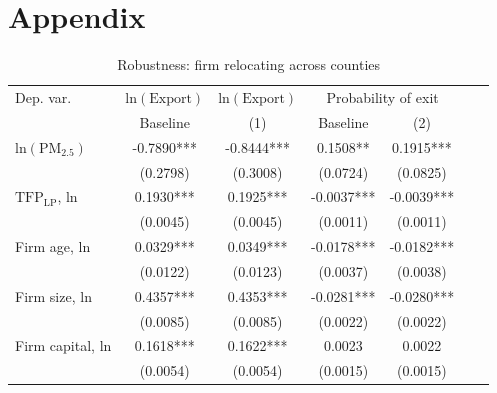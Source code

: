 \documentclass[12pt]{article}
\begin{document}
\renewcommand \thepart{}
\renewcommand \partname{}
\part{Appendix} %
\parttoc 
\begin{table}[H]\centering
  \caption{Robustness: firm relocating across counties}
\footnotesize
  \begin{tabular}{l*{6}{c}}
    \hline\hline
    Dep. var.   &$\mathrm{ln(Export)}$&$\mathrm{ln(Export)}$&\multicolumn{2}{c}{Probability of exit}\\
                &\multicolumn{1}{c}{Baseline}&\multicolumn{1}{c}{(1)}&\multicolumn{1}{c}{Baseline}&\multicolumn{1}{c}{(2)}\\
   \hline                    
    $\mathrm{ln(PM_{2.5})}$           &-0.7890***     &-0.8444***	&0.1508**&0.1915***	     \\
                                      &(0.2798)       &(0.3008)	  &(0.0724) &(0.0825)    \\   
    $\mathrm{TFP_{LP}}$, ln           &0.1930***      &0.1925***    &-0.0037*** &-0.0039*** \\
                                      &(0.0045)        &(0.0045)    &(0.0011)&(0.0011)     \\
    Firm age, ln	                  &0.0329***       &0.0349***   &-0.0178***&-0.0182*** \\
                                      &(0.0122)        &(0.0123)    &(0.0037)&(0.0038)	 \\
    Firm size, ln	                  &0.4357***        &0.4353***  &-0.0281***&-0.0280*** \\
                                      &(0.0085) &(0.0085)           &(0.0022)&(0.0022)	 \\
    Firm capital, ln	              &0.1618***&0.1622***          &0.0023& 0.0022	      \\
                                      &(0.0054) &(0.0054)           &(0.0015)&(0.0015)	 \\
                              

\end{tabular}
\end{table}
\end{document}
